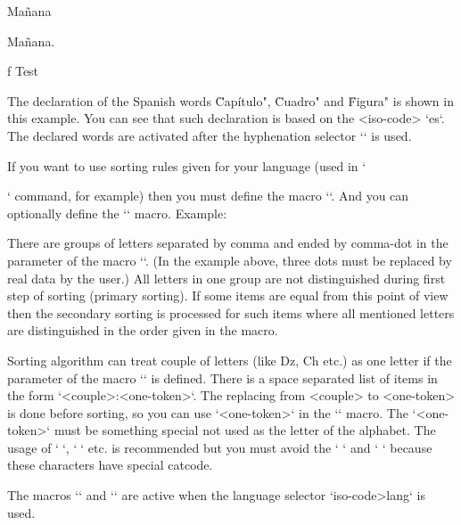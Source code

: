 {\begtt


\eslang %

\sec Mañana

Mañana.

\caption/f Test %

\bye
\endtt

The declaration of the Spanish words \"Capítulo", \"Cuadro" and \"Figura"
is shown in this example. You can see that such declaration is based on the
<iso-code> `es`. The declared words are activated
after the hyphenation selector `\eslang` is used.

If you want to use sorting rules given for your language 
(used in `\makeindex` command, for example) then 
you must define the macro ``. And you can optionally
define the `` macro. Example:

\begtt
\def\sortingdataes {aAäÄáÁ,bB,cCçÇ,^^P^^Q^^R,dD,...,zZ,.}
\def\specsortingdataes {ch:^^P Ch:^^Q CH:^^R}
\endtt

There are groups of letters separated by comma and ended by comma-dot in
the parameter of the macro ``. (In the example above, three dots must
be replaced by real data by the user.) All letters in one group are not
distinguished during first step of sorting (primary sorting). If some items
are equal from this point of view then the secondary sorting is processed
for such items where all mentioned letters are distinguished in the order
given in the macro. 

Sorting algorithm can treat couple of letters (like Dz, Ch etc.) as one letter 
if the parameter of the macro `` is defined. There is
a space separated list of items in the form `<couple>:<one-token>`. The
replacing from <couple> to <one-token> is done before sorting, so you can
use `<one-token>` in the `` macro. The `<one-token>`
must be something special not used as the letter of the alphabet. The usage of
`^^A`, `^^B` etc. is recommended but you must avoid the `^^I` and `^^M` because
these characters have special catcode.

The macros `` and `` are
active when the language selector `\<iso-code>lang` is used.

}
